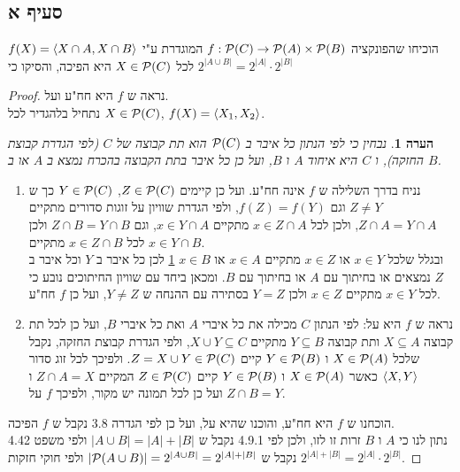 \documentclass{article}
\newtheorem{remark}{הערה}
\begin{document}
	\subsection*{סעיף א}
	הוכיחו שהפונקציה $f: \mathcal{P}(C) \to \mathcal{P}(A) \times \mathcal{P}(B)$ המוגדרת ע"י $f(X) = \langle X \cap A, X \cap B \rangle$
	לכל $X \in \mathcal{P}(C)$ היא הפיכה, והסיקו כי $2^{|A \cup B|} = 2^{|A|} \cdot 2^{|B|}$

	\begin{proof}
		נראה ש $f$ היא חח"ע ועל. \\
		נתחיל בלהגדיר לכל $X \in \mathcal{P}(C)$, $f(X) = \langle X_1, X_2 \rangle$.
		\begin{remark} \label{remark:1}
			נבחין כי לפי הנתון כל איבר ב $\mathcal{P}(C)$ הוא תת קבוצה של $C$ (לפי הגדרת קבוצת החזקה),
			ו $C$ היא איחוד $A$ ו $B$, ועל כן כל איבר בתת הקבוצה בהכרח נמצא ב $A$ או ב $B$.
		\end{remark}
		\begin{enumerate}
			\item נניח בדרך השלילה ש $f$ אינה חח"ע.
			ועל כן קיימים $Z \in \mathcal{P}(C)$, $Y \in \mathcal{P}(C)$ כך ש $Z \neq Y$ וגם $f(Z) = f(Y)$,
			ולפי הגדרת שוויון על זוגות סדורים מתקיים $Z \cap A = Y \cap A$, ולכן לכל $x \in Z \cap A$ מתקיים $x \in Y \cap A$,
			וגם $Z \cap B = Y \cap B$ ולכן לכל $x \in Z \cap B$ מתקיים $x \in Y \cap B$. \\
			ובגלל שלכל $x \in Y$ או $x \in Z$ מתקיים $x \in A$ או $x \in B$ \ref{remark:1}
			לכן כל איבר ב $Y$ וכל איבר ב $Z$ נמצאים או בחיתוך עם $A$ או בחיתוך עם $B$.
			ומכאן ביחד עם שוויון החיתוכים נובע כי לכל $x \in Y$ מתקיים $x \in Z$ ולכן $Y = Z$ בסתירה עם ההנחה ש $Y \neq Z$, ועל כן $f$ חח"ע.

			\item נראה ש $f$ היא על:
			לפי הנתון $C$ מכילה את כל איברי $A$ ואת כל איברי $B$,
			ועל כן לכל תת קבוצה $X \subseteq A$ ותת קבוצה $Y \subseteq B$
			מתקיים $X \cup Y \subseteq C$,
			ולפי הגדרת קבוצת החזקה, נקבל שלכל $X \in \mathcal{P}(A)$ ו $Y \in \mathcal{P}(B)$ קיים $Z = X \cup Y \in \mathcal{P}(C)$.
			ולפיכך לכל זוג סדור $\langle X,Y \rangle$ כאשר $X \in \mathcal{P}(A)$ ו $Y \in \mathcal{P}(B)$ קיים $Z \in \mathcal{P}(C)$
			המקיים $Z \cap A = X$ ו $Z \cap B = Y$ ועל כן לכל תמונה יש מקור, ולפיכך $f$ על.
		\end{enumerate}
		הוכחנו ש $f$ היא חח"ע, והוכנו שהיא על, ועל כן לפי הגדרה 3.8 נקבל ש $f$ הפיכה. \\
		נתון לנו כי $A$ ו $B$ זרות זו לזו, ולכן לפי 4.9.1 נקבל ש $|A \cup B| = |A| + |B|$
		ולפי משפט 4.42 נקבל ש $|\mathcal{P}(A \cup B)| = 2^{|A \cup B|} = 2^{|A| +|B|}$ ולפי חוקי חזקות $2^{|A| +|B|} = 2^{|A|} \cdot 2^{|B|}$.
	\end{proof}
\end{document}
